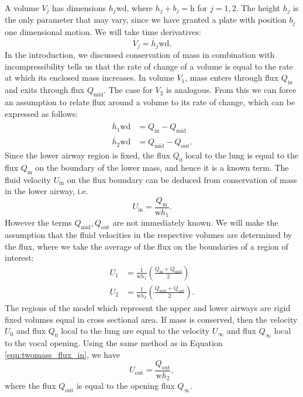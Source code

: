 A volume $V_j$ has dimensions $h_j \mathrm{wd}$, where $h_j + b_j = \mathrm{h}$ for $j=1,2$.
The height $h_j$ is the only parameter that may vary, since we have granted a plate with position $b_j$ one dimensional motion.
We will take time derivatives:
\begin{equation}
    \dot{V_j} = \dot{h_j} \mathrm{wd}.
\end{equation} %
In the introduction, we discussed conservation of mass in combination with incompressibility tells us that the rate of change of a volume is equal to the rate at which its enclosed mass increases.
In volume $V_1$, mass enters through flux $Q_\mathrm{in}$ and exits through flux $Q_\mathrm{mid}$. The case for $V_2$ is analogous.
From this we can force an assumption to relate flux around a volume to its rate of change, which can be expressed as follows:
\begin{equation}
    \begin{aligned}
        \dot{h_1} \mathrm{w d} &= Q_\mathrm{in} - Q_\mathrm{mid} \\
        \dot{h_2} \mathrm{w d} &= Q_\mathrm{mid} - Q_\mathrm{out}.
    \end{aligned} %
    \label{eqn:twomass_flux_motion}
\end{equation}
Since the lower airway region is fixed,
the flux $Q_0$ local to the lung is equal to the flux $Q_\mathrm{in}$ on the boundary of the lower mass,
and hence it is a known term. The fluid velocity $U_\mathrm{in}$ on the flux boundary can be deduced from conservation of mass in the lower airway, i.e.
\begin{equation}
    U_\mathrm{in} = \frac{Q_\mathrm{in}}{\mathrm{w}h_1}.
    \label{eqn:twomass_flux_in}
\end{equation}
However the terms $Q_\mathrm{mid}, Q_\mathrm{out}$ are not immediately known.
We will make the assumption that the fluid velocities in the respective volumes are determined by the flux,
where we take the average of the flux on the boundaries of a region of interest:
\begin{equation}
    \begin{aligned}
        U_1 &= \frac{1}{\mathrm{w}h_1}\left(\frac{Q_\mathrm{in} + Q_\mathrm{mid}}{2}\right) \\
        U_2 &= \frac{1}{\mathrm{w}h_2}\left(\frac{Q_\mathrm{mid} + Q_\mathrm{out}}{2}\right).
        \label{eqn:twomass_velocity_interpolation}
    \end{aligned}
\end{equation}
The regions of the model which represent the upper and lower airways are rigid fixed volumes equal in cross sectional area.
If mass is conserved, then the velocity $U_0$ and flux $Q_0$ local to the lung are equal to the velocity $U_\infty$ and flux $Q_\infty$ local to the vocal opening.
Using the same method as in Equation \ref{eqn:twomass_flux_in}, we have
\begin{equation}
    U_\mathrm{out} = \frac{Q_\mathrm{out}}{\mathrm{w}h_2},
    \label{eqn:twomass_flux_out}
\end{equation}
where the flux $Q_\mathrm{out}$ is equal to the opening flux $Q_\mathrm{\infty}$.

